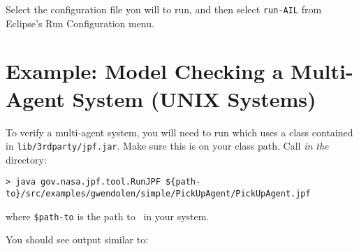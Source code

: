 Select the configuration file you will to run, and then select \texttt{run-AIL} from Eclipse's Run Configuration menu.


\section{Example: Model Checking a Multi-Agent System (UNIX Systems)}

To verify a multi-agent system, you will need to run \jpf which uses a class contained in \texttt{lib/3rdparty/jpf.jar}.  Make sure this is on your class path.  Call \emph{in the \ajpfversion} directory:

\noindent \begin{lstlisting}[basicstyle=\tiny]
> java gov.nasa.jpf.tool.RunJPF ${path-to}/src/examples/gwendolen/simple/PickUpAgent/PickUpAgent.jpf
\end{lstlisting}
\medskip

\noindent where \texttt{\${path-to}} is the path to \ajpfversion\ in your system.

You should see output similar to: 

